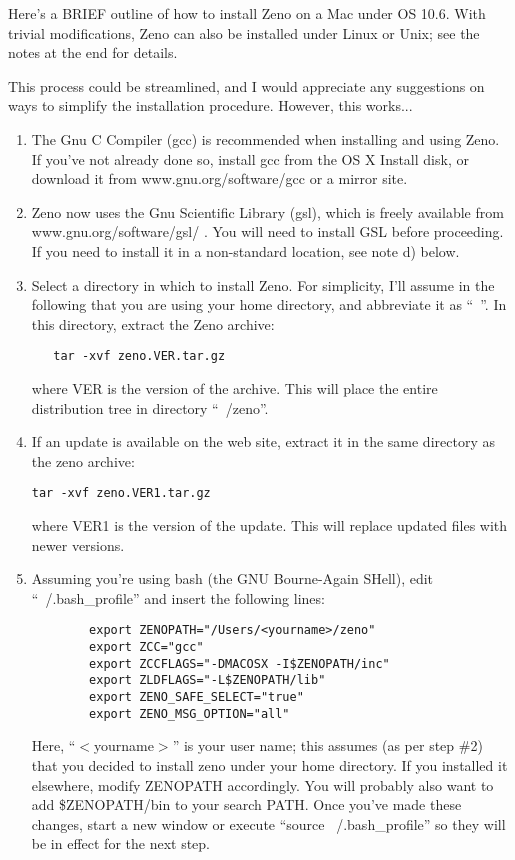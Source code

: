 Here's a BRIEF outline of how to install Zeno on a Mac under OS 10.6.  With trivial modifications, Zeno can also be installed under Linux or Unix; see the notes at the end for details.

This process could be streamlined, and I would appreciate any suggestions on ways to simplify the installation procedure.  However, this works...

\begin{enumerate}
  \item{The Gnu C Compiler (gcc) is recommended when installing and using
Zeno.  If you've not already done so, install gcc from the OS X Install
disk, or download it from www.gnu.org/software/gcc or a mirror site.}
  \item{Zeno now uses the Gnu Scientific Library (gsl), which is freely
available from www.gnu.org/software/gsl/ .  You will need to install GSL
before proceeding.  If you need to install it in a non-standard
location, see note d) below.}
  \item{Select a directory in which to install Zeno.  For simplicity, I'll
assume in the following that you are using your home directory, and
abbreviate it as ``~''.  In this directory, extract the Zeno archive: \\
  \begin{verbatim}
   tar -xvf zeno.VER.tar.gz
  \end{verbatim}
where VER is the version of the archive.  This will place the entire
distribution tree in directory ``~/zeno''.}
\item{If an update is available on the web site, extract it in the same
directory as the zeno archive:
  \begin{verbatim}
tar -xvf zeno.VER1.tar.gz
  \end{verbatim}
where VER1 is the version of the update.  This will replace updated
files with newer versions.}
  \item{Assuming you're using bash (the GNU Bourne-Again SHell), edit ``~/.bash\_profile'' and insert the following lines:
\begin{verbatim}
        export ZENOPATH="/Users/<yourname>/zeno"
        export ZCC="gcc"
        export ZCCFLAGS="-DMACOSX -I$ZENOPATH/inc"
        export ZLDFLAGS="-L$ZENOPATH/lib"
        export ZENO_SAFE_SELECT="true"
        export ZENO_MSG_OPTION="all"
\end{verbatim}
Here, ``$<$yourname$>$'' is your user name; this assumes (as per step \#2) that you decided to install zeno under your home directory.  If you installed it elsewhere, modify ZENOPATH accordingly.  You will probably also want to add \$ZENOPATH/bin to your search PATH.  Once you've made these changes, start a new window or execute ``source ~/.bash\_profile'' so they will be in effect for the next step.

}
\end{enumerate}
